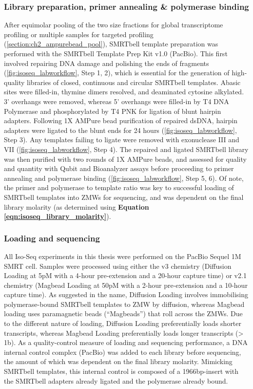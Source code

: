 \subsubsection{Library preparation, primer annealing \& polymerase binding}
\label{section:ch2_smrtbelltemplate_explanation} 
After equimolar pooling of the two size fractions for global transcriptome profiling or multiple samples for targeted profiling (\cref{section:ch2_ampurebead_pool}), SMRTbell template preparation was performed with the SMRTbell Template Prep Kit v1.0 (PacBio). This first involved repairing DNA damage and polishing the ends of fragments (\cref{fig:isoseq_labworkflow}, Step 1, 2), which is essential for the generation of high-quality libraries of closed, continuous and circular SMRTbell templates. Abasic sites were filled-in, thymine dimers resolved, and deaminated cytosine alkylated. 3’ overhangs were removed, whereas 5’ overhangs were filled-in by T4 DNA Polymerase and phosphorylated by T4 PNK for ligation of blunt hairpin adapters. Following 1X AMPure bead purification of repaired dsDNA, hairpin adapters were ligated to the blunt ends for 24 hours (\cref{fig:isoseq_labworkflow}, Step 3). Any templates failing to ligate were removed with exonuclease III and VII (\cref{fig:isoseq_labworkflow}, Step 4). The repaired and ligated SMRTbell library was then purified with two rounds of 1X AMPure beads, and assessed for quality and quantity with Qubit and Bioanalyzer assays before proceeding to primer annealing and polymerase binding (\cref{fig:isoseq_labworkflow}, Step 5, 6). Of note, the primer and polymerase to template ratio was key to successful loading of SMRTbell templates into ZMWs for sequencing, and was dependent on the final library molarity (as determined using \textbf{Equation \ref{eqn:isoseq_library_molarity}}). 


\subsubsection{Loading and sequencing} 
\label{section:ch2_sequencing}
All Iso-Seq experiments in this thesis were performed on the PacBio Sequel 1M SMRT cell. Samples were processed using either the v3 chemistry (Diffusion Loading at 5pM with a 4-hour pre-extension and a 20-hour capture time) or v2.1 chemistry (Magbead Loading at 50pM with a 2-hour pre-extension and a 10-hour capture time). As suggested in the name, Diffusion Loading involves immobilising polymerase-bound SMRTbell templates to ZMW by diffusion, whereas Magbead loading uses paramagnetic beads (“Magbeads”) that roll across the ZMWs. Due to the different nature of loading, Diffusion Loading preferentially loads shorter transcripts, whereas Magbead Loading preferentially loads longer transcripts (> 1b). As a quality-control measure of loading and sequencing performance, a DNA internal control complex (PacBio) was added to each library before sequencing, the amount of which was dependent on the final library molarity. Mimicking SMRTbell templates, this internal control is composed of a 1966bp-insert with the SMRTbell adapters already ligated and the polymerase already bound.


